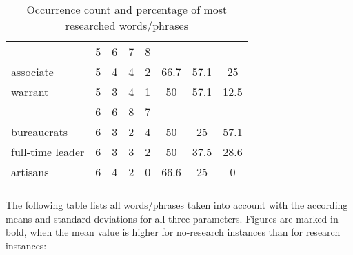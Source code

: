 \begin{table}
\begin{tabularx}{\textwidth}{Qrrrr *{3}{S[table-format=2.1]}}
& 5 & 6 & 7 & 8 & {} & {} & {}\\
 associate & 5 & 4 & 4 & 2 & 66.7 & 57.1 & 25\\
 warrant & 5 & 3 & 4 & 1 & 50 & 57.1 & 12.5\\
& 6 & 6 & 8 & 7 & {} & {} & {}\\
 bureaucrats & 6 & 3 & 2 & 4 & 50 & 25 & 57.1\\
 full-time leader & 6 & 3 & 3 & 2 & 50 & 37.5 & 28.6\\
 artisans & 6 & 4 & 2 & 0 & 66.6 & 25 & 0\\
\lspbottomrule
\end{tabularx}
\caption{Occurrence count and percentage of most researched words\slash phrases\label{tab:B:1}}
\end{table}


The following table lists all words\slash phrases taken into account with the according means and standard deviations for all three parameters. Figures are marked in bold, when the mean value is higher for no-research instances than for research instances:


